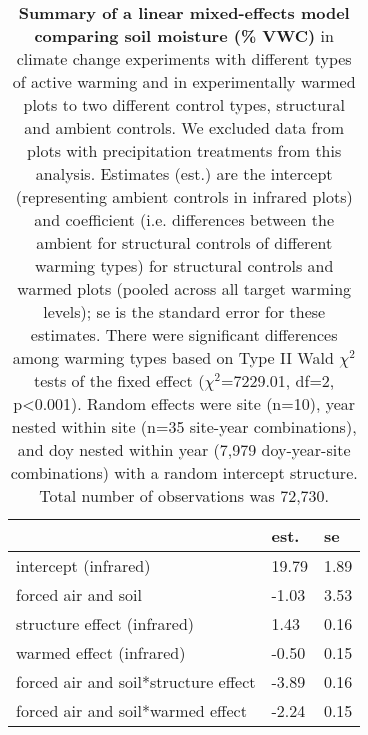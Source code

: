 \documentclass{article}
\begin{document}
\begin{table}[ht]
\centering
\caption{\textbf{Summary of a linear mixed-effects model comparing soil moisture (\% VWC)} in climate change experiments with different types of active warming and in experimentally warmed plots to two different control types, structural and ambient controls. We excluded data from plots with precipitation treatments from this analysis. Estimates (est.) are the intercept (representing ambient controls in infrared plots) and coefficient (i.e. differences between the ambient for structural controls of different warming types) for structural controls and warmed plots (pooled across all target warming levels); se is the standard error for these estimates. There were significant differences among warming types based on Type II Wald $\chi^{2}$ tests of the fixed effect ($\chi^{2}$=7229.01, df=2, p<0.001). Random effects were site (n=10), year nested within site (n=35 site-year combinations), and doy nested within year (7,979 doy-year-site combinations) with a random intercept structure. Total number of observations was 72,730.} 
\label{table:warmsoilmois}
\begingroup\footnotesize
\begin{tabular}{|p{}|p{}p{}|}
  \hline
 & est. & se \\ 
  \hline
intercept (infrared) & 19.79 & 1.89 \\ 
  forced air and soil & -1.03 & 3.53 \\ 
  structure effect (infrared) & 1.43 & 0.16 \\ 
  warmed effect (infrared) & -0.50 & 0.15 \\ 
  forced air and soil*structure effect & -3.89 & 0.16 \\ 
  forced air and soil*warmed effect & -2.24 & 0.15 \\ 
   \hline
\end{tabular}
\endgroup
\end{table}%
\end{document}
